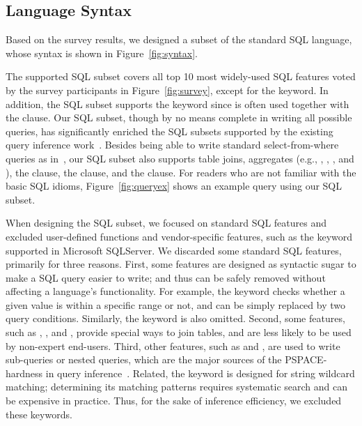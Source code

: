 \vspace{-1mm}
\subsection{Language Syntax}
\label{sec:syntax}
\vspace{-1mm}

Based on the survey results, we designed a subset
of the standard SQL language, whose
syntax is shown in Figure~\ref{fig:syntax}.


The supported SQL subset covers all top 10 most widely-used SQL
features voted by the survey participants
in Figure~\ref{fig:survey}, except for the  keyword.
In addition, the SQL subset supports the 
keyword since  is often used together with the  clause.
Our SQL subset, though by no means complete in writing all
possible queries, has significantly
enriched the SQL subsets supported by the existing query inference
work~\cite{DasSarma:2010, Tran:2009}. Besides being able to write
standard select-from-where queries as in~\cite{DasSarma:2010, Tran:2009},
our SQL subset also supports table joins, aggregates
(e.g., , , , and ),
the  clause, the  clause,
and the  clause. For readers who are not
familiar with the basic SQL idioms, Figure~\ref{fig:queryex}
shows an example query using our SQL subset.


When designing the SQL subset, we focused on standard
SQL features and excluded user-defined functions and
vendor-specific features, such as the 
keyword supported in Microsoft SQLServer. 
We discarded some standard SQL features, primarily for
three reasons. First, some features are designed
as syntactic sugar to make a SQL query easier to write;
and thus can be safely removed without affecting a language's
functionality. For example, the 
keyword checks whether a given value is within a specific
range or not, and can be simply replaced by two query conditions.
Similarly, the  keyword is also omitted.
Second, some features, such as 
, , and ,
provide special ways to join tables, and are less likely to be
used by non-expert end-users.
Third, other features, such as  and ,
are used to write sub-queries or nested queries, which are the major sources
of the PSPACE-hardness in query inference~\cite{DasSarma:2010}.
Related, the  keyword is designed for string
wildcard matching; determining its matching
patterns requires systematic search and can be
expensive in practice. Thus, 
for the sake of inference efficiency, we excluded these keywords.

